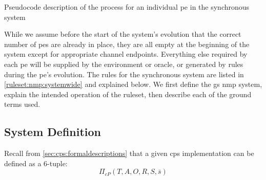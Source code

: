 \begin{algorithm}
\DontPrintSemicolon
{}
\caption[Pseudocode of the \acrlong{nmp} process in the synchronous system]{\label{alg:nmp:systemwide2}Pseudocode description of the process for an individual \gls{pe} in the synchronous system}
\end{algorithm}

While we assume before the start of the system's evolution that the correct number of \glspl{pe} are already in place, they are all empty at the beginning of the system except for appropriate channel endpoints.  Everything else required by each \gls{pe} will be supplied by the environment or oracle, or generated by rules during the \gls{pe}'s evolution.  The rules for the synchronous system are listed in \cref{ruleset:nmp:systemwide} and explained below.  We first define the \gls{gs} \gls{nmp} system, explain the intended operation of the ruleset, then describe each of the ground terms used.

\subsection{System Definition}
Recall from \cref{sec:cps:formaldescriptions} that a given \gls{cps} implementation can be defined as a 6-tuple:
\[
\Pi_{cP}(T, A, O, R, S, \bar{s})
\]

